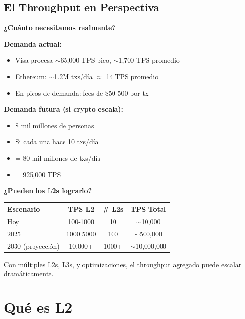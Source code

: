 \documentclass[11pt,a4paper,twoside,openright]{book}
\theoremstyle{definition}
\theoremstyle{plain}
\theoremstyle{remark}
\begin{document}
\subsection{El Throughput en Perspectiva}

\begin{mathnote}
\textbf{¿Cuánto necesitamos realmente?}

\textbf{Demanda actual:}
\begin{itemize}
    \item Visa procesa $\sim$65,000 TPS pico, $\sim$1,700 TPS promedio
    \item Ethereum: $\sim$1.2M txs/día $\approx$ 14 TPS promedio
    \item En picos de demanda: fees de \$50-500 por tx
\end{itemize}

\textbf{Demanda futura (si crypto escala):}
\begin{itemize}
    \item 8 mil millones de personas
    \item Si cada una hace 10 txs/día
    \item = 80 mil millones de txs/día
    \item = 925,000 TPS
\end{itemize}

\textbf{¿Pueden los L2s lograrlo?}

\begin{center}
\begin{tabular}{lccc}
\toprule
\textbf{Escenario} & \textbf{TPS L2} & \textbf{\# L2s} & \textbf{TPS Total} \\
\midrule
Hoy & 100-1000 & 10 & $\sim$10,000 \\
2025 & 1000-5000 & 100 & $\sim$500,000 \\
2030 (proyección) & 10,000+ & 1000+ & $\sim$10,000,000 \\
\bottomrule
\end{tabular}
\end{center}

Con múltiples L2s, L3s, y optimizaciones, el throughput agregado puede escalar dramáticamente.
\end{mathnote}

\section{Qué es L2}
\end{document}
